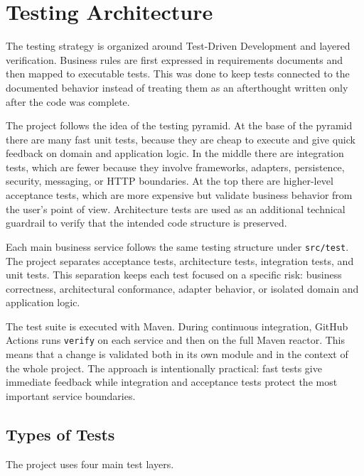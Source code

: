 \documentclass[12pt,a4paper]{article}
\begin{document}
\section{Testing Architecture}

The testing strategy is organized around Test-Driven Development and layered verification. Business rules are first expressed in requirements documents and then mapped to executable tests. This was done to keep tests connected to the documented behavior instead of treating them as an afterthought written only after the code was complete.

The project follows the idea of the testing pyramid. At the base of the pyramid there are many fast unit tests, because they are cheap to execute and give quick feedback on domain and application logic. In the middle there are integration tests, which are fewer because they involve frameworks, adapters, persistence, security, messaging, or HTTP boundaries. At the top there are higher-level acceptance tests, which are more expensive but validate business behavior from the user's point of view. Architecture tests are used as an additional technical guardrail to verify that the intended code structure is preserved.

Each main business service follows the same testing structure under \texttt{src/test}. The project separates acceptance tests, architecture tests, integration tests, and unit tests. This separation keeps each test focused on a specific risk: business correctness, architectural conformance, adapter behavior, or isolated domain and application logic.

The test suite is executed with Maven. During continuous integration, GitHub Actions runs \texttt{verify} on each service and then on the full Maven reactor. This means that a change is validated both in its own module and in the context of the whole project. The approach is intentionally practical: fast tests give immediate feedback while integration and acceptance tests protect the most important service boundaries.

\subsection{Types of Tests}

The project uses four main test layers.
\end{document}
